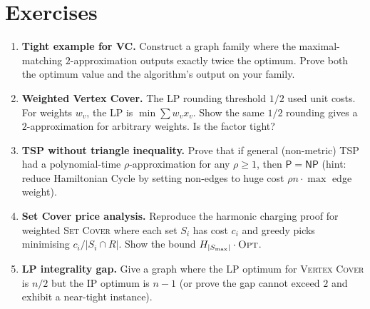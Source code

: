 \section{Exercises}
\label{sec:ch01-exercises}
\begin{enumerate}[label=E1.\arabic*, leftmargin=*, itemsep=0.7em]
    \item \textbf{Tight example for VC.} Construct a graph family where the maximal-matching $2$-approximation outputs exactly twice the optimum. Prove both the optimum value and the algorithm's output on your family.
    \item \textbf{Weighted Vertex Cover.} The LP rounding threshold $1/2$ used unit costs. For weights $w_v$, the LP is $\min\sum w_vx_v$. Show the same $1/2$ rounding gives a $2$-approximation for arbitrary weights. Is the factor tight?
    \item \textbf{TSP without triangle inequality.} Prove that if general (non-metric) TSP had a polynomial-time $\rho$-approximation for any $\rho\ge1$, then $\mathsf{P}=\mathsf{NP}$ (hint: reduce Hamiltonian Cycle by setting non-edges to huge cost $\rho n\cdot\max$ edge weight).
    \item \textbf{Set Cover price analysis.} Reproduce the harmonic charging proof for weighted \textsc{Set Cover} where each set $S_i$ has cost $c_i$ and greedy picks minimising $c_i/|S_i\cap R|$. Show the bound $H_{|S_{\max}|}\cdot\textsc{Opt}$.
    \item \textbf{LP integrality gap.} Give a graph where the LP optimum for \textsc{Vertex Cover} is $n/2$ but the IP optimum is $n-1$ (or prove the gap cannot exceed $2$ and exhibit a near-tight instance).
\end{enumerate}
